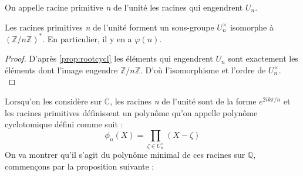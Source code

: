 \documentclass[a4paper]{article} %
\numberwithin{section}{part}
\numberwithin{equation}{section}
\newcommand\nroot[1]{\textit{#1}\up{\textit{ième}}}
\newcommand\zmodn[1]{\mathbb{Z}/#1\mathbb{Z}}
\newcommand\QQ{\mathbb{Q}}
\newcommand\CC{\mathbb{C}}
\begin{document}
\begin{defn}
On appelle racine primitive \nroot{n} de l'unité les racines qui engendrent 
$U_n$.
\end{defn}

\begin{prop}
Les racines primitives \nroot{n} de l'unité forment un sous-groupe $U^{\times}_n
$ 
isomorphe à $(\zmodn{n})^*$. En particulier, il y en a $\varphi(n)$.
\end{prop}
\begin{proof}
D'après \ref{prop:rootcycl} les éléments qui engendrent $U_n$ sont exactement 
les éléments dont l'image engendre $\zmodn{n}$. D'où l'isomorphisme et l'ordre 
de $U^{\times}_n$.\\
\end{proof}

Lorsqu'on les considère sur $\CC$, les racines \nroot{n} de l'unité sont 
de la forme $e^{2ik\pi/n}$ et les racines primitives définissent un polynôme 
qu'on appelle polynôme cyclotomique défini comme suit : 
\[\phi_n(X) = \prod_{\zeta\in U_n^{\times}}{(X - \zeta)}\]
On va montrer qu'il s'agit du polynôme minimal de ces racines sur $\QQ$, 
commençons par la proposition suivante :
\end{document}

